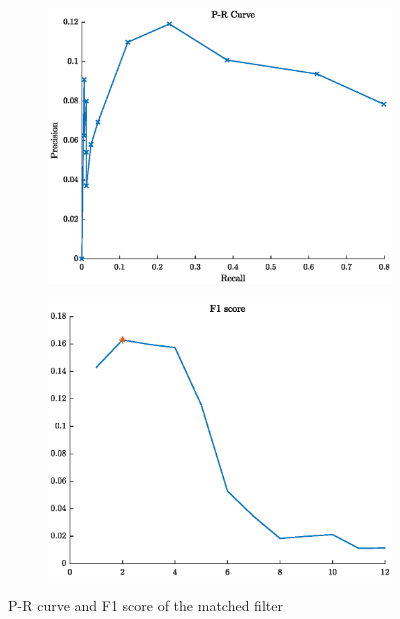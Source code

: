 \documentclass[pagesize,english,DIV=calc,footinclude=false
]{scrartcl}
\begin{document}
\begin{figure}[htbp]
  \centering
  \begin{subfigure}[b]{0.48\linewidth}
    \includegraphics[width=\linewidth]{PR_curve.eps}
  \end{subfigure}
  \begin{subfigure}[b]{0.48\linewidth}
    \includegraphics[width=\linewidth]{F1_score.eps}
  \end{subfigure}
  \caption{P-R curve and F1 score of the matched filter}
  \label{fig:pr_curve}
\end{figure}
\end{document}

